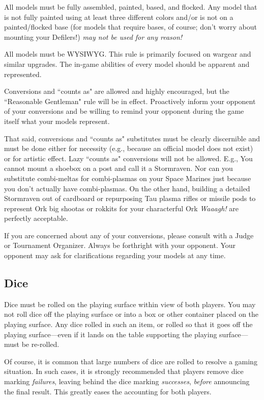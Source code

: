 \documentclass[10pt,titlepage]{article}
\begin{document}
All models must be fully assembled, painted, based, and flocked. Any model that is not fully painted using at least three different colors and/or is not on a painted/flocked base (for models that require bases, of course; don't worry about mounting your Defilers!) \textit{may not be used for any reason!}

All models must be WYSIWYG. This rule is primarily focused on wargear and similar upgrades. The in-game abilities of every model should be apparent and represented.

Conversions and ``counts as" are allowed and highly encouraged, but the ``Reasonable Gentleman" rule will be in effect. Proactively inform your opponent of your conversions and be willing to remind your opponent during the game itself what your models represent.

That said, conversions and ``counts as" substitutes must be clearly discernible and must be done either for necessity (e.g., because an official model does not exist) or for artistic effect. Lazy ``counts as" conversions will not be allowed. E.g., You cannot mount a shoebox on a post and call it a Stormraven. Nor can you substitute combi-meltas for combi-plasmas on your Space Marines just because you don't actually have combi-plasmas. On the other hand, building a detailed Stormraven out of cardboard or repurposing Tau plasma rifles or missile pods to represent Ork big shootas or rokkits for your characterful Ork \textit{Waaagh!} are perfectly acceptable.

If you are concerned about any of your conversions, please consult with a Judge or Tournament Organizer. Always be forthright with your opponent. Your opponent may ask for clarifications regarding your models at any time.

\subsection*{Dice}

Dice must be rolled on the playing surface within view of both players. You may not roll dice off the playing surface or into a box or other container placed on the playing surface. Any dice rolled in such an item, or rolled so that it goes off the playing surface---even if it lands on the table supporting the playing surface---must be re-rolled.

Of course, it is common that large numbers of dice are rolled to resolve a gaming situation. In such cases, it is strongly recommended that players remove dice marking \textit{failures}, leaving behind the dice marking \textit{successes}, \textit{before} announcing the final result. This greatly eases the accounting for both players.
\end{document}
